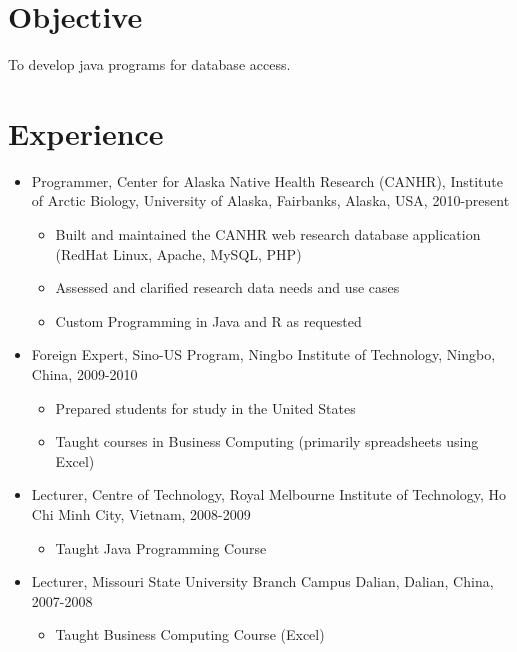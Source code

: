 \documentclass{res}
\begin{document}
\address{Post Office Box 84145 \\ Fairbanks, Alaska 99708 \\ merrymanemory@gmail.com \\ (907)347-4951}
\begin{resume}
  \section{Objective}
  To develop java programs for database access.
  \section{Experience}
  \begin{itemize}
    \item Programmer, Center for Alaska Native Health Research (CANHR), Institute of Arctic Biology, University of Alaska, Fairbanks, Alaska, USA, 2010-present
      \begin{itemize}
      \item Built and maintained the CANHR web research database application (RedHat Linux, Apache, MySQL, PHP)
      \item Assessed and clarified research data needs and use cases
      \item Custom Programming in Java and R as requested
      \end{itemize}
    \item Foreign Expert, Sino-US Program, Ningbo Institute of Technology, Ningbo, China, 2009-2010
      \begin{itemize}
        \item Prepared students for study in the United States
        \item Taught courses in Business Computing (primarily spreadsheets using Excel)
      \end{itemize}
    \item Lecturer, Centre of Technology, Royal Melbourne Institute of Technology, Ho Chi Minh City, Vietnam, 2008-2009
      \begin{itemize}
        \item Taught Java Programming Course
      \end{itemize}
    \item Lecturer, Missouri State University Branch Campus Dalian, Dalian, China, 2007-2008
      \begin{itemize}
      \item Taught Business Computing Course (Excel)

\end{itemize}
\end{itemize}
\end{resume}
\end{document}
